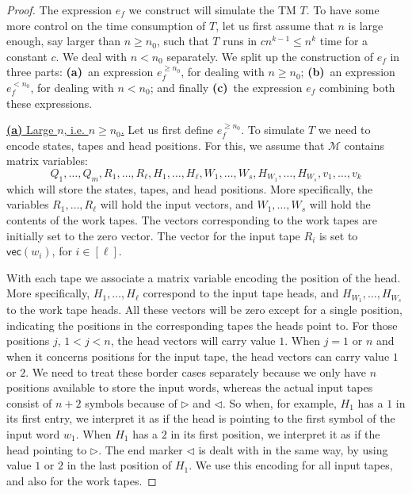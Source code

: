 \begin{proof}
	The expression $e_f$ we construct will simulate the TM $T$. To have some more control on the time consumption of $T$, let us first assume that $n$ is large enough, say larger than $n\geq n_0$, 
	such that $T$ runs in $cn^{k-1}\leq n^{k}$ time for a constant $c$. We deal with $n<n_0$ separately.
 We split up the construction of $e_f$ in three
	parts: \textbf{(a)}~an expression $e_f^{\geq n_0}$, for dealing with $n\geq n_0$; \textbf{(b)}~an expression
	$e_f^{<n_0}$, for dealing with $n<n_0$; and finally \textbf{(c)}~the expression $e_f$ combining both these expressions. 

\medskip
\noindent
\underline{\textbf{(a)} Large $n$, i.e. $n\geq n_0$.}
    Let us first define $e_f^{\geq n_0}$. To simulate $T$ we need to encode states, tapes and head positions. For this, we assume that $\mathcal{M}$ contains matrix variables:
    $$
    Q_1,\ldots,Q_m, R_1,\ldots,R_\ell, H_1,\ldots,H_\ell, W_1,\ldots,W_s, H_{W_1},\ldots,H_{W_s}, v_1,\ldots,v_{k}
    $$
    which will store the states, tapes, and head positions. More specifically, the variables 
    $R_1,\ldots,R_\ell$ will hold the input vectors, and $W_1,\ldots,W_s$ will hold the contents of the work
    tapes.
	The vectors corresponding to the work tapes are initially set to the zero vector. 
    The vector for the input tape $R_i$ is set to $\mathsf{vec}(w_i)$, for $i\in[\ell]$.

\smallskip
    With each tape we associate a matrix variable encoding the position of the head. More specifically, 
    $H_1,\ldots,H_\ell$ correspond to the input tape heads, and
    $H_{W_1},\ldots, H_{W_s}$ to the work tape heads.
    All these vectors will be zero except 
    for a single position, indicating the positions in the corresponding tapes the heads point to. 
    For those positions $j$, $1<j<n$, the head vectors will carry value $1$.  When $j=1$ or $n$ and when 
    it concerns positions for the input tape, the head vectors can carry value $1$ or $2$. We need to treat 
    these border cases separately
    because we only have $n$ positions available to store the input words, whereas the actual input tapes 
    consist of $n+2$ symbols because of $\rhd$ and $\lhd$. So when, for example, $H_1$ has a $1$ in its first
    entry, we interpret it as if the head is pointing to the first symbol of the input word $w_1$. When $H_1$
    has a $2$ in its first position, we interpret it as if the head pointing to $\rhd$. The end marker $\lhd$ is
    dealt with in the same way, by using value $1$ or $2$ in the last position of $H_1$. We use this encoding
    for all input tapes, and also for the work tapes.
    


\end{proof}
